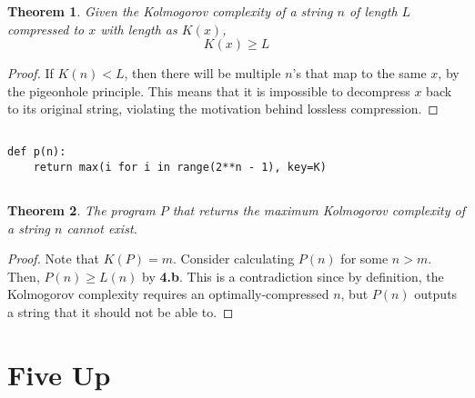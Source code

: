 \documentclass{article}
\newtheorem{theorem}{Theorem}
\begin{document}
\begin{theorem}
    Given the Kolmogorov complexity of a string \(n\) of length \(L\) compressed to \(x\) with length as \(K(x)\),
    \begin{equation}
        K(x) \geqslant L
    \end{equation}
\end{theorem}
\begin{proof}
    If \(K(n) < L\), then there will be multiple \(n\)'s that map to the same \(x\), by the pigeonhole principle.
    This means that it is impossible to decompress \(x\) back to its original string, violating the motivation behind lossless compression.
\end{proof}

\subsection{}

\begin{lstlisting}
def p(n):
    return max(i for i in range(2**n - 1), key=K)
\end{lstlisting}

\subsection{}

\begin{theorem}
    The program \(P\) that returns the maximum Kolmogorov complexity of a string \(n\) cannot exist.
\end{theorem}
\begin{proof}
    Note that \(K(P) = m\).
    Consider calculating \(P(n)\) for some \(n > m\).
    Then, \(P(n) \geqslant L(n)\) by \textbf{4.b}.
    This is a contradiction since by definition, the Kolmogorov complexity requires an optimally-compressed \(n\), but \(P(n)\) outputs a string that it should not be able to.
\end{proof}

\section{Five Up}
\end{document}
